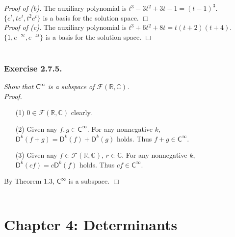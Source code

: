 \documentclass{article}
\begin{document}
\emph{Proof of (b).}
The auxiliary polynomial is
$t^3-3t^2+3t-1 = (t-1)^3.$
$\{ e^{t}, te^{t}, t^2e^{t} \}$
is a basis for the solution space.
$\Box$ \\

\emph{Proof of (c).}
The auxiliary polynomial is
$t^3+6t^2+8t = t(t+2)(t+4).$
$\{ 1, e^{-2t}, e^{-4t} \}$
is a basis for the solution space.
$\Box$ \\\\






\subsubsection*{Exercise 2.7.5.}
\emph{Show that $\mathsf{C}^{\infty}$ is a subspace of
$\mathcal{F}(\mathbb{R}, \mathbb{C})$. } \\

\emph{Proof.}
\begin{enumerate}
\item[(1)]
$0 \in \mathcal{F}(\mathbb{R}, \mathbb{C})$ clearly.
\item[(2)]
Given any $f, g \in \mathsf{C}^{\infty}$.
For any nonnegative $k$,
$\mathsf{D}^k(f+g) = \mathsf{D}^k(f) + \mathsf{D}^k(g)$ holds.
Thus $f+g \in \mathsf{C}^{\infty}$.
\item[(3)]
Given any $f \in \mathcal{F}(\mathbb{R}, \mathbb{C})$, $r \in \mathbb{C}$.
For any nonnegative $k$,
$\mathsf{D}^k(cf) = c\mathsf{D}^k(f)$ holds.
Thus $cf \in \mathsf{C}^{\infty}$.
\end{enumerate}
By Theorem 1.3, $\mathsf{C}^{\infty}$ is a subspace.
$\Box$ \\\\






\newpage
\section*{Chapter 4: Determinants \\}
\end{document}
